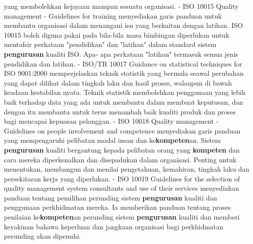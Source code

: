 \documentclass{article}
\begin{document}
 yang membolehkan kejayaan mampan sesuatu organisasi.
- ISO 10015 Quality management - Guidelines for training menyediakan garis panduan
 untuk membantu organisasi dalam menangani isu yang berkaitan dengan latihan. ISO
 10015 boleh diguna pakai pada bila-bila masa bimbingan diperlukan untuk mentafsir
 perkataan "pendidikan" dan "latihan" dalam standard sistem \textbf{pengurusan} kualiti ISO. Apa-
 apa perkataan "latihan" termasuk semua jenis pendidikan dan latihan.
- ISO/TR 10017 Guidance on statistical techniques for ISO 9001:2000 memperjelaskan
 teknik statistik yang bermula seawal perubahan yang dapat dilihat dalam tingkah laku dan
 hasil proses, walaupun di bawah keadaan kestabilan nyata. Teknik statistik
 membolehkan penggunaan yang lebih baik terhadap data yang ada untuk membantu
 dalam membuat keputusan, dan dengan itu membantu untuk terus menambah baik kualiti
 produk dan proses bagi mencapai kepuasan pelanggan.
- ISO 10018 Quality management - Guidelines on people involvement and competence
 menyediakan garis panduan yang mempengaruhi pelibatan modal insan dan
 ke\textbf{kompeten}an. Sistem \textbf{pengurusan} kualiti bergantung kepada pelibatan orang yang
 \textbf{kompeten} dan cara mereka diperkenalkan dan disepadukan dalam organisasi. Penting
 untuk menentukan, membangun dan menilai pengetahuan, kemahiran, tingkah laku dan
 persekitaran kerja yang diperlukan.
- ISO 10019 Guidelines for the selection of quality management system consultants and
 use of their services menyediakan panduan tentang pemilihan perunding sistem
 \textbf{pengurusan} kualiti dan penggunaan perkhidmatan mereka. Ia memberikan panduan
 tentang proses penilaian ke\textbf{kompeten}an perunding sistem \textbf{pengurusan} kualiti dan
 memberi keyakinan bahawa keperluan dan jangkaan organisasi bagi perkhidmatan
 perunding akan dipenuhi.
\end{document}
